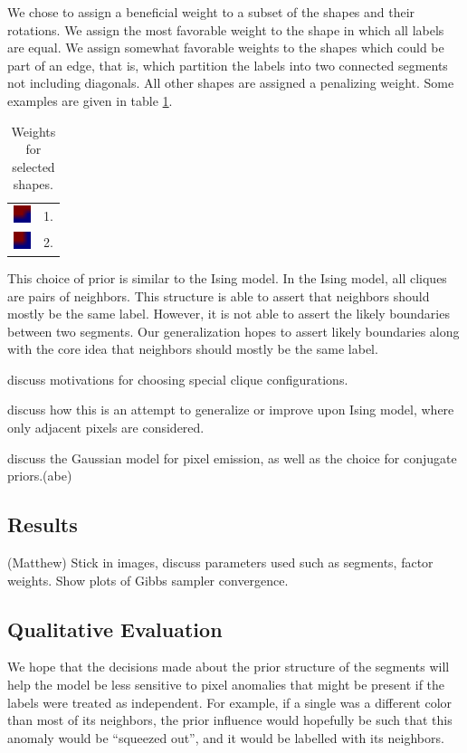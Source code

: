\documentclass[12pt]{article}
\begin{document}
We chose to assign a beneficial weight to a subset of the shapes and their
rotations. We assign the most favorable weight to the shape in which all labels
are equal. We assign somewhat favorable weights to the shapes which could be
part of an edge, that is, which partition the labels into two connected
segments not including diagonals. All other shapes are assigned a penalizing
weight. Some examples are given in table \ref{table:shapes}.

\begin{table}
    \begin{tabular}{| l | l |}
        \includegraphics[width=5mm]{shapes/15.png} & 1.\\
        \includegraphics[width=5mm]{shapes/11.png} & 2.\\
    \end{tabular}
    \caption{Weights for selected shapes.}
    \label{table:shapes}
\end{table}

This choice of prior is similar to the Ising model. In the Ising model, all
cliques are pairs of neighbors. This structure is able to assert that neighbors
should mostly be the same label. However, it is not able to assert the likely
boundaries between two segments. Our generalization hopes to assert likely
boundaries along with the core idea that neighbors should mostly be the same
label.

discuss motivations for choosing special clique configurations. 

discuss how this is an attempt to generalize or improve upon Ising model, where
only adjacent pixels are considered.

discuss the Gaussian model for pixel emission, as well as the choice for conjugate priors.(abe)

\subsection*{Results}(Matthew)
Stick in images, discuss parameters used such as segments, factor weights.
Show plots of Gibbs sampler convergence.


\subsection*{Qualitative Evaluation}
We hope that the decisions made about the prior structure of the segments will
help the model be less sensitive to pixel anomalies that might be present if
the labels were treated as independent. For example, if a single was a
different color than most of its neighbors, the prior influence would hopefully
be such that this anomaly would be ``squeezed out'', and it would be labelled
with its neighbors.
\end{document}
